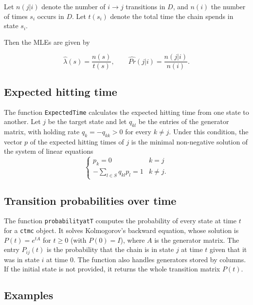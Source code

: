 \documentclass[
  nojss]{jss}
\begin{document}
Let \(n(j|i)\) denote the number of \(i \to j\) transitions in \(D\), and \(n(i)\) the number of times \(s_i\) occurs in \(D\). Let \(t(s_i)\) denote the total time the chain spends in state \(s_i\).

Then the MLEs are given by

\[
\hat{\lambda}(s) = \frac{n(s)}{t(s)}, \qquad \widehat{Pr}(j|i)=\frac{n(j|i)}{n(i)}.
\]

\subsection{Expected hitting time}\label{expected-hitting-time}

The function \texttt{ExpectedTime} calculates the expected hitting time from one state to another. Let \(j\) be the target state and let \(q_{kl}\) be the entries of the generator matrix, with holding rate \(q_k=-q_{kk} > 0\) for every \(k \neq j\). Under this condition, the vector \(p\) of the expected hitting times of \(j\) is the minimal non-negative solution of the system of linear equations
\begin{equation}
\begin{cases}
      p_{k} = 0 & k = j \\
      -\sum_{l \in S} q_{kl}p_{l} = 1 & k \neq j.
\end{cases}
\label{eq:EHT}
\end{equation}

\subsection{Transition probabilities over time}\label{transition-probabilities-over-time}

The function \texttt{probabilityatT} computes the probability of every state at time \(t\) for a \texttt{ctmc} object. It solves Kolmogorov's backward equation, whose solution is \(P(t) = e^{tA}\) for \(t \geq 0\) (with \(P(0) = I\)), where \(A\) is the generator matrix. The entry \(P_{ij}(t)\) is the probability that the chain is in state \(j\) at time \(t\) given that it was in state \(i\) at time \(0\). The function also handles generators stored by columns. If the initial state is not provided, it returns the whole transition matrix \(P(t)\).

\subsection{Examples}\label{examples}
\end{document}
